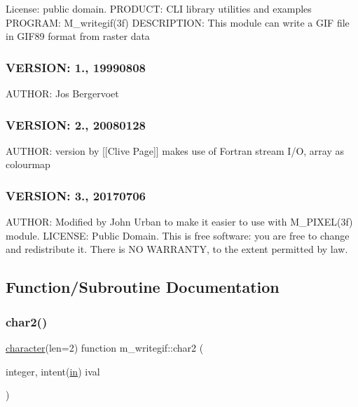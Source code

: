 License\+: public domain. P\+R\+O\+D\+U\+CT\+: C\+LI library utilities and examples P\+R\+O\+G\+R\+AM\+: M\+\_\+writegif(3f) D\+E\+S\+C\+R\+I\+P\+T\+I\+ON\+: This module can write a G\+IF file in G\+I\+F89 format from raster data \subsubsection*{V\+E\+R\+S\+I\+ON\+: 1., 19990808}

A\+U\+T\+H\+OR\+: Jos Bergervoet \subsubsection*{V\+E\+R\+S\+I\+ON\+: 2., 20080128}

A\+U\+T\+H\+OR\+: version by \mbox{[}\mbox{[}Clive Page\mbox{]}\mbox{]} makes use of Fortran stream I/O, array as colourmap \subsubsection*{V\+E\+R\+S\+I\+ON\+: 3., 20170706}

A\+U\+T\+H\+OR\+: Modified by John Urban to make it easier to use with M\+\_\+\+P\+I\+X\+E\+L(3f) module. L\+I\+C\+E\+N\+SE\+: Public Domain. This is free software\+: you are free to change and redistribute it. There is NO W\+A\+R\+R\+A\+N\+TY, to the extent permitted by law. 

\subsection{Function/\+Subroutine Documentation}
\mbox{\label{namespacem__writegif_a79ebbfd4c7df8520a82c75c3a62f0c96}} 
\subsubsection{\texorpdfstring{char2()}{char2()}}
{\footnotesize\ttfamily \hyperlink{option__stopwatch_83_8txt_abd4b21fbbd175834027b5224bfe97e66}{character}(len=2) function m\+\_\+writegif\+::char2 (\begin{DoxyParamCaption}\item[{integer, intent(\hyperlink{M__journal_83_8txt_afce72651d1eed785a2132bee863b2f38}{in})}]{ival }\end{DoxyParamCaption})\hspace{0.3cm}{\ttfamily [private]}}

